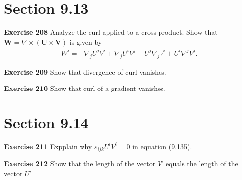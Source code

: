 \documentclass[12pt,a4paper]{report}
\begin{document}
\begin{description}
\section{Section 9.13}
\item \textbf{Exercise 208} Analyze the curl applied to a cross product.  Show that $\textbf{W}= \nabla\times(\textbf{U}\times\textbf{V})$ is given by 
\begin{align*}
	W^i = -\nabla_jU^jV^i+\nabla_jU^iV^j-U^j\nabla_jV^i+U^i\nabla^jV^j.
\end{align*}
\item \textbf{Exercise 209} Show that divergence of curl vanishes.
\item \textbf{Exercise 210} Show that curl of a gradient vanishes.
\section{Section 9.14}
\item \textbf{Exercise 211} Expplain why $\varepsilon_{ijk}U^iV^i = 0$ in equation (9.135).
\item \textbf{Exercise 212} Show that the length of the vector $V^i$ equals the length of the vector $U^i$
\end{description}
\end{document}

